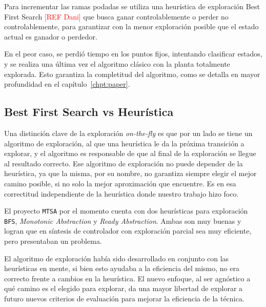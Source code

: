 Para incrementar las ramas podadas se utiliza una heurística de exploración Best First Search \textcolor{red}{[REF Dani]} que busca ganar controlablemente o perder no controlablemente, para garantizar con la menor exploración posible que el estado actual es ganador o perdedor.

En el peor caso, se perdió tiempo en los puntos fijos, intentando clasificar estados, y se realiza una última vez el algoritmo clásico con la planta totalmente explorada. Esto garantiza la completitud del algoritmo, como se detalla en mayor profundidad en el capítulo~\ref{chpt:paper}.

\subsection{Best First Search vs Heurística}

Una distinción clave de la exploración \textit{on-the-fly} es que por un lado se tiene un algoritmo de exploración, al que una heurística le da la próxima transición a explorar, y el algoritmo es responsable de que al final de la exploración se llegue al resultado correcto. Ese algoritmo de exploración no puede depender de la heurística, ya que la misma, por su nombre, no garantiza siempre elegir el mejor camino posible, si no solo la mejor aproximación que encuentre. Es en esa correctitud independiente de la heurística donde nuestro trabajo hizo foco.

El proyecto \texttt{MTSA} por el momento cuenta con dos heurísticas para exploración \texttt{BFS}, \textit{Monotonic Abstraction} y \textit{Ready Abstraction}. Ambas son muy buenas y logran que en síntesis de controlador con exploración parcial sea muy eficiente, pero presentaban un problema.

El algoritmo de exploración había sido desarrollado en conjunto con las heurísticas en mente, si bien esto ayudaba a la eficiencia del mismo, no era correcto frente a cambios en la heurística. El nuevo enfoque, al ser agnóstico a qué camino es el elegido para explorar, da una mayor libertad de explorar a futuro nuevos criterios de evaluación para mejorar la eficiencia de la técnica.













